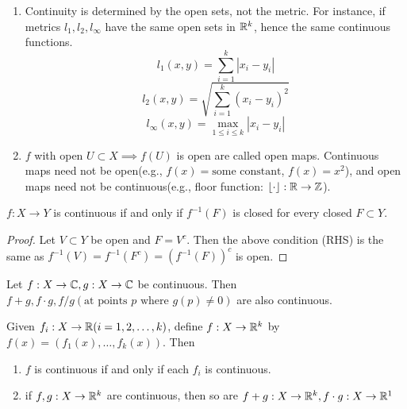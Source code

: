 \begin{theorem}
\begin{remark}
\begin{enumerate}
			\item Continuity is determined by the open sets, not the metric. For instance, if metrics $l_1,l_2,l_{\infty}$ have the same open sets in $\mathbb{R}^{k}$, hence the same continuous functions.
			      \[
				      l_1(x,y)=\sum_{i=1}^{k}{|x_i-y_i|}
			      \]
			      \[
				      l_2(x,y)=\sqrt{\sum_{i=1}^{k}{(x_i-y_i)^2}}
			      \]
			      \[
				      l_{\infty}(x,y)=\max_{1\le i\le k}{|x_i-y_i|}
			      \]
			\item $f$ with open $U \subset X \implies f(U)$ is open are called open maps. Continuous maps need not be open(e.g., $f(x)=\text{some constant}$, $f(x)=x^2$), and open maps need not be continuous(e.g., floor function: $\left\lfloor \cdot \right\rfloor: \mathbb{R}\to \mathbb{Z}$).
		\end{enumerate}
	\end{remark}
\end{theorem}

\begin{corollary}
	$f:X\to Y$ is continuous if and only if $f^{-1}(F)$ is closed for every closed $F \subset Y$.
	\begin{proof}
		Let $V \subset Y$ be open and $F=V^{c}$. Then the above condition (RHS) is the same as $f^{-1}(V)=f^{-1}(F^{c})=(f^{-1}(F))^{c}$ is open.
	\end{proof}
\end{corollary}


\begin{theorem}[9]
	Let $f: X\to \mathbb{C}, g: X\to \mathbb{C}$ be continuous. Then $f+g, f \cdot g, f/g(\text{at points $p$ where $g(p)\neq 0$})$ are also continuous.
\end{theorem}

\begin{theorem}[10]
	Given $f_i: X\to \mathbb{R}(i=1,2,\ldots ,k)$, define $f: X\to \mathbb{R}^{k}$ by $f(x)=(f_1(x),\ldots ,f_k(x))$.
	Then
	\begin{enumerate}
		\item
		      $f$ is continuous if and only if each $f_i$ is continuous.
		\item if $f,g: X\to \mathbb{R}^{k}$ are continuous, then so are $f+g: X\to \mathbb{R}^{k}, f \cdot g: X\to \mathbb{R}^{1}$
	\end{enumerate}
\end{theorem}


